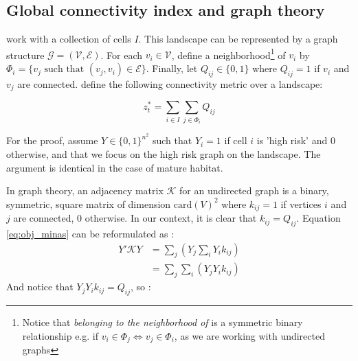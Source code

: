 
\subsection{Global connectivity index and graph theory}

\label{sec:connectivity}


\cite{minas_spatial_2014} work with a collection of cells $I$. This landscape can be represented by a graph structure $\mathcal{G}=(\mathcal{V}, \mathcal{E})$.
For each $v_i \in \mathcal{V}$, define a neighborhood\footnote{Notice that \textit{belonging to the neighborhood of} is a symmetric binary relationship e.g. if $v_i \in \Phi_j \iff v_j \in \Phi_i$, as we are working with undirected graphs} of $v_i$ by $\Phi_i = \{ v_j \text{ such that } (v_j, v_i) \in \mathcal{E} \}$. 
Finally, let $Q_{ij} \in \{0,1\}$ where $Q_{ij}=1$ if $v_i$ and $v_j$ are connected. \cite{minas_spatial_2014} define the following connectivity metric over a landscape: 

\begin{equation}
    z^*_t = \sum_{i \in I}\sum_{j \in \Phi_i}Q_{ij}
    \label{eq:obj_minas}
\end{equation}

For the proof, assume $Y \in \{0,1\}^{n^2}$ such that $Y_i=1$ if cell $i$ is 'high risk' and $0$ otherwise, and that we focus on the high risk graph on the landscape. The argument is identical in the case of mature habitat. 

In graph theory, an adjacency matrix $\mathcal{K}$ for an undirected graph is a binary, symmetric, square matrix of dimension $\mathrm{card}(V)^2$ where $k_{ij}=1$ if vertices $i$ and $j$ are connected, $0$ otherwise. In our context, it is clear that $k_{ij}=Q_{ij}$. Equation \ref{eq:obj_minas} can be reformulated as : 
\begin{align*}
    Y' \mathcal{K} Y &= \sum_j\left( Y_j \sum_i Y_i k_{ij}\right)\\
    &= \sum_j \sum_i \left( Y_j Y_i k_{ij}\right)
\end{align*}
And notice that $Y_j Y_i k_{ij} = Q_{ij}$, so :

